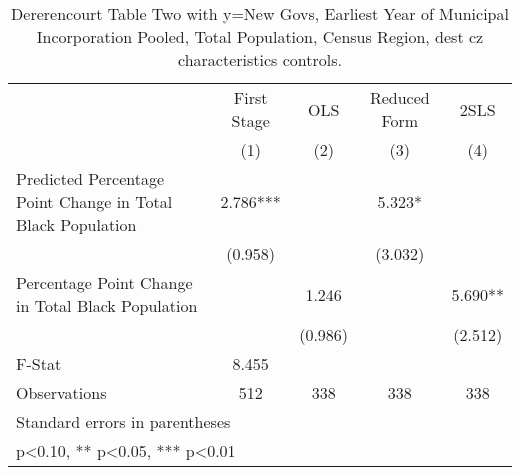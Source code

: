 \begin{table}[htbp]\centering
\def\sym#1{\ifmmode^{#1}\else\(^{#1}\)\fi}
\caption{Dererencourt Table Two with y=New Govs, Earliest Year of Municipal Incorporation  Pooled, Total Population, Census Region, dest cz characteristics controls.}
\begin{tabular}{l*{4}{c}}
\toprule
                    & First Stage   &         OLS   &Reduced Form   &        2SLS   \\
                    &\multicolumn{1}{c}{(1)}   &\multicolumn{1}{c}{(2)}   &\multicolumn{1}{c}{(3)}   &\multicolumn{1}{c}{(4)}   \\
\midrule
Predicted Percentage Point Change in Total Black Population&       2.786***&               &       5.323*  &               \\
                    &     (0.958)   &               &     (3.032)   &               \\
\addlinespace
Percentage Point Change in Total Black Population&               &       1.246   &               &       5.690** \\
                    &               &     (0.986)   &               &     (2.512)   \\
\midrule
F-Stat              &       8.455   &               &               &               \\
Observations        &         512   &         338   &         338   &         338   \\
\bottomrule
\multicolumn{5}{l}{\footnotesize Standard errors in parentheses}\\
\multicolumn{5}{l}{\footnotesize * p<0.10, ** p<0.05, *** p<0.01}\\
\end{tabular}
\end{table}
